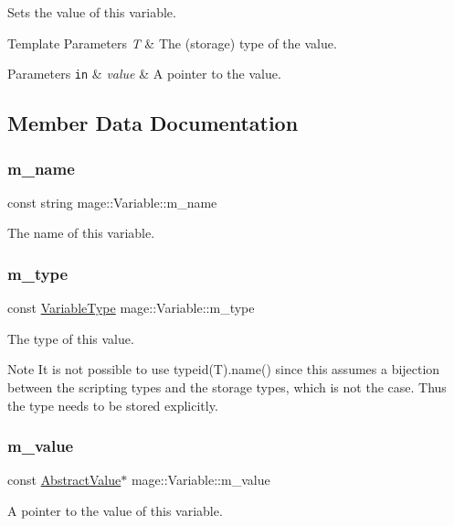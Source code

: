 Sets the value of this variable.


\begin{DoxyTemplParams}{Template Parameters}
{\em T} & The (storage) type of the value. \\
\hline
\end{DoxyTemplParams}

\begin{DoxyParams}[1]{Parameters}
\mbox{\tt in}  & {\em value} & A pointer to the value. \\
\hline
\end{DoxyParams}


\subsection{Member Data Documentation}
\hypertarget{structmage_1_1_variable_afac262aa51bb1dfe447d501abcaa08d0}{}\label{structmage_1_1_variable_afac262aa51bb1dfe447d501abcaa08d0} 
\subsubsection{\texorpdfstring{m\+\_\+name}{m\_name}}
{\footnotesize\ttfamily const string mage\+::\+Variable\+::m\+\_\+name\hspace{0.3cm}{\ttfamily [private]}}

The name of this variable. \hypertarget{structmage_1_1_variable_acb45a61a0690e0efac614915595c4449}{}\label{structmage_1_1_variable_acb45a61a0690e0efac614915595c4449} 
\subsubsection{\texorpdfstring{m\+\_\+type}{m\_type}}
{\footnotesize\ttfamily const \hyperlink{namespacemage_a530428e73bac0ba7fe84b29086a9e33a}{Variable\+Type} mage\+::\+Variable\+::m\+\_\+type\hspace{0.3cm}{\ttfamily [private]}}

The type of this value.

\begin{DoxyNote}{Note}
It is not possible to use typeid(\+T).name() since this assumes a bijection between the scripting types and the storage types, which is not the case. Thus the type needs to be stored explicitly. 
\end{DoxyNote}
\hypertarget{structmage_1_1_variable_a99388f3fbccf983b8d6954fd31d0eb27}{}\label{structmage_1_1_variable_a99388f3fbccf983b8d6954fd31d0eb27} 
\subsubsection{\texorpdfstring{m\+\_\+value}{m\_value}}
{\footnotesize\ttfamily const \hyperlink{structmage_1_1_variable_1_1_abstract_value}{Abstract\+Value}$\ast$ mage\+::\+Variable\+::m\+\_\+value\hspace{0.3cm}{\ttfamily [private]}}

A pointer to the value of this variable. 